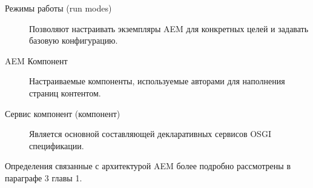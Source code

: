 \begin{description}
\item[Режимы работы (run modes)] Позволяют настраивать экземпляры AEM для конкретных целей и задавать базовую конфигурацию.
\item[AEM Компонент] Настраиваемые компоненты, используемые авторами для наполнения страниц контентом.
\item[Сервис компонент (компонент)] Является основной составляющей декларативных сервисов OSGI спецификации.
\end{description}

Определения связанные с архитектурой AEM более подробно рассмотрены в параграфе 3 главы 1.

